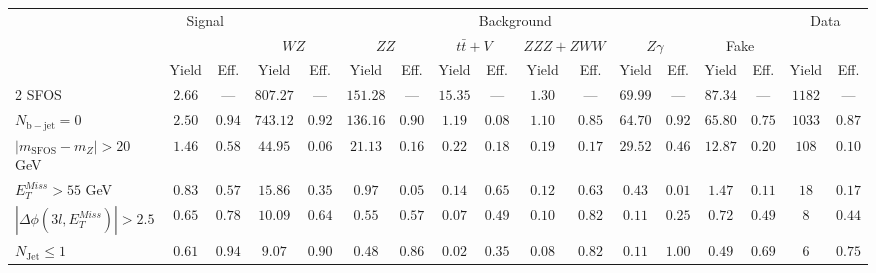 \begin{tabular}{l||c|c||c|c||c|c||c|c||c|c||c|c||c|c||c|c}
\hline
 &                 \multicolumn{2}{c||}{Signal}            &  \multicolumn{12}{c||}{Background} &  \multicolumn{2}{c}{Data} \\
 & &  & \multicolumn{2}{c||}{$WZ$} & \multicolumn{2}{c||}{$ZZ$} & \multicolumn{2}{c||}{$t\bar{t}+V$} & \multicolumn{2}{c||}{$ZZZ+ZWW$} & \multicolumn{2}{c||}{$Z\gamma$} & \multicolumn{2}{c||}{Fake} &  & \\ 
 & Yield & Eff. & Yield & Eff. & Yield & Eff. & Yield & Eff. & Yield & Eff. & Yield & Eff. & Yield & Eff.  & Yield & Eff.\\
\hline\hline
2 SFOS &  $2.66$ &  --- &  $807.27$ &  --- &  $151.28$ &  --- &  $15.35$ &  --- &  $1.30$ &  --- &  $69.99$ &  --- &  $87.34$ &  --- & $1182$ &  ---\\ 
\hline
$N_{\mathrm{b-jet}}=0$ &  $2.50$ &  $0.94$ &  $743.12$ &  $0.92$ &  $136.16$ &  $0.90$ &  $1.19$ &  $0.08$ &  $1.10$ &  $0.85$ &  $64.70$ &  $0.92$ &  $65.80$ &  $0.75$ & $1033$ &  $0.87$\\ 
\hline
$| m_{\mathrm{SFOS}} - m_Z | >  20$ GeV &  $1.46$ &  $0.58$ &  $44.95$ &  $0.06$ &  $21.13$ &  $0.16$ &  $0.22$ &  $0.18$ &  $0.19$ &  $0.17$ &  $29.52$ &  $0.46$ &  $12.87$ &  $0.20$ & $108$ &  $0.10$\\ 
\hline
$E_{T}^{Miss} > 55$ GeV &  $0.83$ &  $0.57$ &  $15.86$ &  $0.35$ &  $0.97$ &  $0.05$ &  $0.14$ &  $0.65$ &  $0.12$ &  $0.63$ &  $0.43$ &  $0.01$ &  $1.47$ &  $0.11$ & $18$ &  $0.17$\\ 
\hline
$|\Delta\phi(3l,E_{T}^{Miss})| > 2.5$ &  $0.65$ &  $0.78$ &  $10.09$ &  $0.64$ &  $0.55$ &  $0.57$ &  $0.07$ &  $0.49$ &  $0.10$ &  $0.82$ &  $0.11$ &  $0.25$ &  $0.72$ &  $0.49$ & $8$ &  $0.44$\\ 
\hline
$N_{\mathrm{Jet}} \leq 1$ &  $0.61$ &  $0.94$ &  $9.07$ &  $0.90$ &  $0.48$ &  $0.86$ &  $0.02$ &  $0.35$ &  $0.08$ &  $0.82$ &  $0.11$ &  $1.00$ &  $0.49$ &  $0.69$ & $6$ &  $0.75$\\ 
\hline
\end{tabular}


